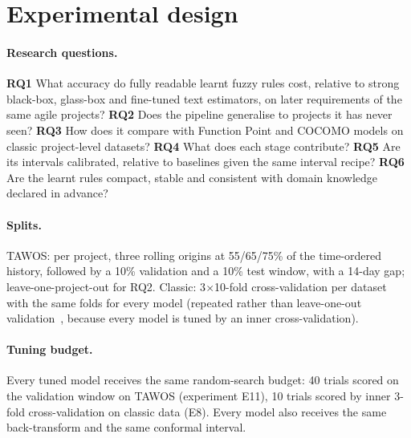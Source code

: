 \documentclass[preprint,12pt,authoryear]{elsarticle}
\begin{document}
\section{Experimental design}
\label{sec:design}

\paragraph{Research questions.}
\textbf{RQ1} What accuracy do fully readable learnt fuzzy rules cost, relative to strong black-box, glass-box and
fine-tuned text estimators, on later requirements of the same agile projects?
\textbf{RQ2} Does the pipeline generalise to projects it has never seen?
\textbf{RQ3} How does it compare with Function Point and COCOMO models on classic project-level datasets?
\textbf{RQ4} What does each stage contribute?
\textbf{RQ5} Are its intervals calibrated, relative to baselines given the same interval recipe?
\textbf{RQ6} Are the learnt rules compact, stable and consistent with domain knowledge declared in advance?

\paragraph{Splits.}  TAWOS: per project, three rolling origins at 55/65/75\% of the time-ordered history, followed by
a 10\% validation and a 10\% test window, with a 14-day gap; leave-one-project-out for RQ2.  Classic: 3$\times$10-fold
cross-validation per dataset with the same folds for every model (repeated rather than leave-one-out
validation~\citep{kocaguneli2013loo}, because every model is tuned by an inner cross-validation).

\paragraph{Tuning budget.}  Every tuned model receives the same random-search budget: 40 trials scored on the
validation window on TAWOS (experiment E11), 10 trials scored by inner 3-fold cross-validation on classic data (E8).
Every model also receives the same back-transform and the same conformal interval.
\end{document}

